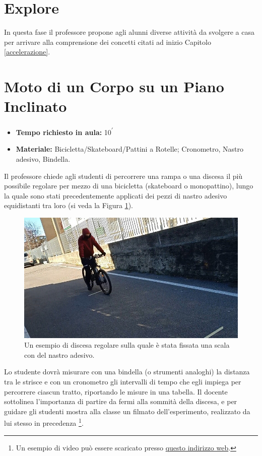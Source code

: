 \documentclass{report} \usepackage[T1]{fontenc} \usepackage[italian]{babel}
\begin{document}
\section{Explore}

In questa fase il professore propone agli alunni diverse attività da svolgere a
casa per arrivare alla comprensione dei concetti citati ad inizio Capitolo \ref{accelerazione}.

\section{Moto di un Corpo su un Piano Inclinato}

\begin{itemize}
\item \textbf{Tempo richiesto in aula:} 10\textsuperscript{$\prime$}
\item \textbf{Materiale:} Bicicletta/Skateboard/Pattini a Rotelle; Cronometro,
Nastro adesivo, Bindella.
\end{itemize}

Il professore chiede agli studenti di percorrere una rampa o
una discesa il più possibile regolare per mezzo di una bicicletta (skateboard o
monopattino), lungo la quale sono stati precedentemente applicati dei pezzi di nastro
adesivo equidistanti tra loro (si veda la Figura \ref{fig:bicicletta_rampa}).
\begin{figure}[H]
\centering
  \includegraphics[width=\textwidth]{bicicletta_rampa}
  \caption{Un esempio di discesa regolare sulla quale è stata fissata
           una scala con del nastro adesivo.
          }
  \label{fig:bicicletta_rampa}
\end{figure}
Lo studente dovrà misurare con una bindella (o strumenti analoghi)
la distanza tra le strisce e con un cronometro gli intervalli di tempo che egli impiega
per percorrere ciascun tratto, riportando le misure in una tabella.
Il docente sottolinea l’importanza di partire da fermi alla sommità della
discesa, e per guidare gli studenti  mostra alla classe un filmato
dell’esperimento, realizzato da lui stesso in precedenza
\footnote{
          Un esempio di video può essere scaricato presso
          \textcolor{blue}{\href{https://github.com/savaroskij/PED1/blob/master/progetto_finale/media/video/bicletta_rampa.mp4?raw=true}{questo indirizzo web}}.
         }.
\end{document}
